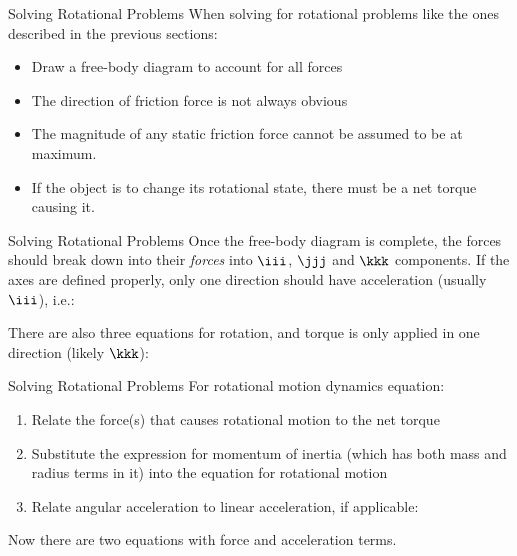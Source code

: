 \documentclass[12pt,compress,aspectratio=169]{beamer}
\begin{document}
\begin{frame}{Solving Rotational Problems}
  When solving for rotational problems like the ones described in the previous
  sections:
  \begin{itemize}
  \item Draw a free-body diagram to account for all forces
  \item The direction of friction force is not always obvious
  \item The magnitude of any static friction force cannot be assumed to be at
    maximum.
  \item If the object is to change its rotational state, there must be a net
    torque causing it.
  \end{itemize}
\end{frame}



\begin{frame}{Solving Rotational Problems}
  Once the free-body diagram is complete, the forces should break down into
  their \emph{forces} into $\iii$, $\jjj$ and $\kkk$ components. If the axes
  are defined properly, only one direction should have acceleration (usually
  $\iii$), i.e.:
  

  There are also three equations for rotation, and torque is only applied in one
  direction (likely $\kkk$):
    
\end{frame}



\begin{frame}{Solving Rotational Problems}
  For rotational motion dynamics equation:
  \begin{enumerate}
  \item Relate the force(s) that causes rotational motion to the net torque

  \item Substitute the expression for momentum of inertia (which has both mass
    and radius terms in it) into the equation for rotational motion
  \item Relate angular acceleration to linear acceleration, if applicable:

  \end{enumerate}
  Now there are two equations with force and acceleration terms.
\end{frame}
\end{document}
